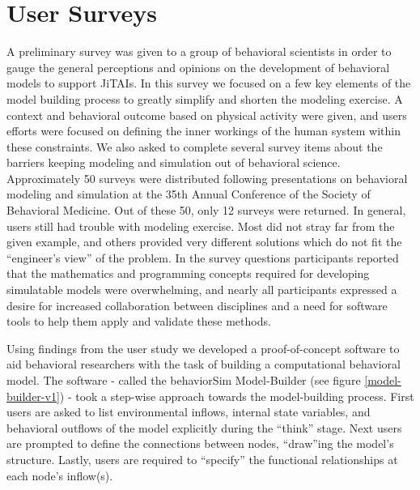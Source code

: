 \documentclass{sigchi}
\begin{document}
\section{User Surveys}
A preliminary survey was given to a group of behavioral scientists in order to gauge the general perceptions and opinions on the development of behavioral models to support JiTAIs.
In this survey we focused on a few key elements of the model building process to greatly simplify and shorten the modeling exercise.
A context and behavioral outcome based on physical activity were given, and users efforts were focused on defining the inner workings of the human system within these constraints.
We also asked to complete several survey items about the barriers keeping modeling and simulation out of behavioral science.
Approximately 50 surveys were distributed following presentations on behavioral modeling and simulation at the 35th Annual Conference of the Society of Behavioral Medicine. 
Out of these 50, only 12 surveys were returned.
In general, users still had trouble with modeling exercise.
Most did not stray far from the given example, and others provided very different solutions which do not fit the ``engineer's view'' of the problem.
In the survey questions participants reported that the mathematics and programming concepts required for developing simulatable models were overwhelming, and nearly all participants expressed a desire for increased collaboration between disciplines and a need for software tools to help them apply and validate these methods.


Using findings from the user study we developed a proof-of-concept software to aid behavioral researchers with the task of building a computational behavioral model. 
The software - called the behaviorSim Model-Builder (see figure \ref{model-builder-v1}) - took a step-wise approach towards the model-building process.
First users are asked to list environmental inflows, internal state variables, and behavioral outflows of the model explicitly during the ``think'' stage.
Next users are prompted to define the connections between nodes, ``draw''ing the model's structure.
Lastly, users are required to ``specify'' the functional relationships at each node's inflow(s).
\end{document}
